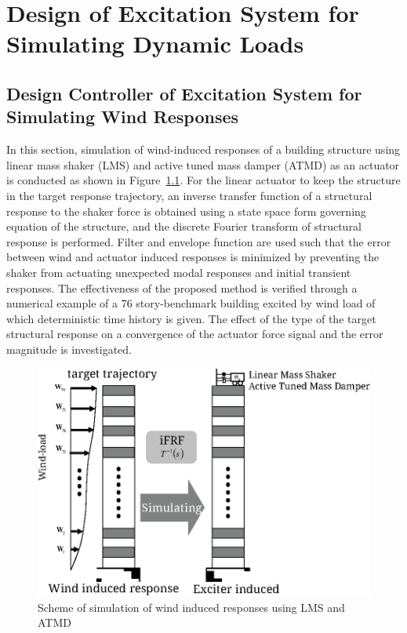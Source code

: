\chapter{Design of Excitation System for Simulating Dynamic Loads}
\label{chap:6}
\section{Design Controller of Excitation System for Simulating Wind Responses}


In this section, simulation of wind-induced responses of a building structure using linear mass shaker (LMS) and active tuned mass damper (ATMD) as an actuator is conducted as shown in Figure~\ref{fig:6-1}. For the linear actuator to keep the structure in the target response trajectory, an inverse transfer function of a structural response to the shaker force is obtained using a state space form governing equation of the structure, and the discrete Fourier transform of structural response is performed. Filter and envelope function are used such that the error between wind and actuator induced responses is minimized by preventing the shaker from actuating unexpected modal responses and initial transient responses. The effectiveness of the proposed method is verified through a numerical example of a 76 story-benchmark building excited by wind load of which deterministic time history is given. The effect of the type of the target structural response on a convergence of the actuator force signal and the error magnitude is investigated.

\begin{figure}[ht]
\centering
\includegraphics[width=1\textwidth] {figure/6-1.eps}
\caption{Scheme of simulation of wind induced responses using LMS and ATMD}
\label{fig:6-1}
\end{figure}

